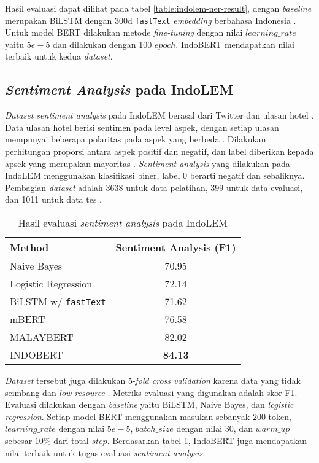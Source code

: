 Hasil evaluasi dapat dilihat pada tabel \ref{table:indolem-ner-result}, dengan \textit{baseline} merupakan BiLSTM dengan 300d \texttt{fastText} \textit{embedding} berbahasa Indonesia \parencite{indolem}. Untuk model BERT dilakukan metode \textit{fine-tuning} dengan nilai $learning\_rate$ yaitu $5e-5$ dan dilakukan dengan 100 $epoch$. IndoBERT mendapatkan nilai terbaik untuk kedua \textit{dataset}.

\subsection{\textit{Sentiment Analysis} pada IndoLEM}

\textit{Dataset sentiment analysis} pada IndoLEM berasal dari Twitter dan ulasan hotel \parencite{indolem}. Data ulasan hotel berisi sentimen pada level aspek, dengan setiap ulasan mempunyai beberapa polaritas pada aspek yang berbeda \parencite{indolem}. Dilakukan perhitungan proporsi antara aspek positif dan negatif, dan label diberikan kepada apsek yang merupakan mayoritas \parencite{indolem}. \textit{Sentiment analysis} yang dilakukan pada IndoLEM menggunakan klasifikasi biner, label 0 berarti negatif dan sebaliknya. Pembagian \textit{dataset} adalah 3638 untuk data pelatihan, 399 untuk data evaluasi, dan 1011 untuk data tes \parencite{indolem}. 

\begin{table}[h]
    \vspace{0.25cm}
    \centering
    \caption{Hasil evaluasi \textit{sentiment analysis} pada IndoLEM}
    \label{table:indolem-sentiment-result}
    \begin{tabular}{lc}
        \toprule
        \textbf{Method} & \textbf{Sentiment Analysis (F1)} \\
        \midrule
        Naive Bayes & 70.95 \\
        Logistic Regression & 72.14 \\
        BiLSTM w/ \texttt{fastText} & 71.62 \\
        mBERT & 76.58 \\
        MALAYBERT & 82.02 \\
        INDOBERT & \textbf{84.13} \\
        \bottomrule
    \end{tabular}
\end{table}

\textit{Dataset} tersebut juga dilakukan 5-\textit{fold cross validation} karena data yang tidak seimbang dan \textit{low-resource} \parencite{indolem}. Metriks evaluasi yang digunakan adalah skor F1. Evaluasi dilakukan dengan \textit{baseline} yaitu BiLSTM, Naive Bayes, dan \textit{logistic regression}. Setiap model BERT menggunakan masukan sebanyak 200 token, $learning\_rate$ dengan nilai $5e-5$, $batch\_size$ dengan nilai 30, dan $warm\_up$ sebesar $10\%$ dari total $step$. Berdasarkan tabel \ref{table:indolem-sentiment-result}, IndoBERT juga mendapatkan nilai terbaik untuk tugas evaluasi \textit{sentiment analysis}.

